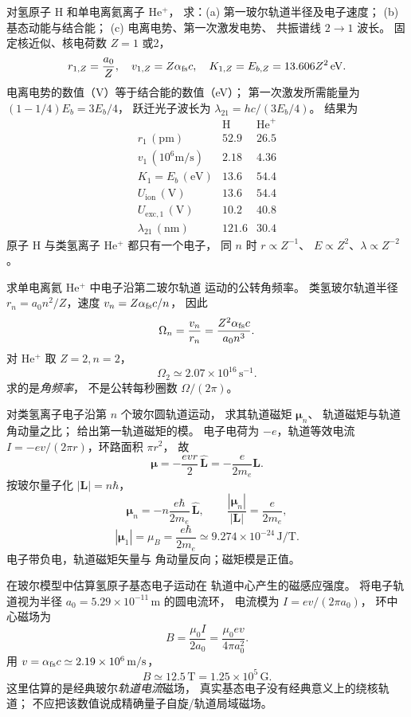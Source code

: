 对氢原子 H 和单电离氦离子 He$^+$，
求：(a) 第一玻尔轨道半径及电子速度；
(b) 基态动能与结合能；
(c) 电离电势、第一次激发电势、
共振谱线 $2\to1$ 波长。
\exsolution
固定核近似、核电荷数 $Z=1$ 或2，
\[
 r_{1,Z}=\frac{a_0}{Z},\quad
 v_{1,Z}=Z\alpha_{\rm fs}c,\quad
 K_{1,Z}=E_{b,Z}=13.606Z^2\,\mathrm{eV}.
\]
电离电势的数值（V）等于结合能的数值（eV）；
第一次激发所需能量为
$(1-1/4)E_b=3E_b/4$，
跃迁光子波长为 $\lambda_{21}=hc/(3E_b/4)$。
结果为
\[
\begin{array}{c|cc}
 &\mathrm H&\mathrm{He}^{+}\\\hline
 r_1\,(\mathrm{pm})&52.9&26.5\\
 v_1\,(10^6\mathrm{m/s})&2.18&4.36\\
 K_1=E_b\,(\mathrm{eV})&13.6&54.4\\
 U_{\mathrm{ion}}\,(\mathrm V)&13.6&54.4\\
 U_{\mathrm{exc},1}\,(\mathrm V)&10.2&40.8\\
 \lambda_{21}\,(\mathrm{nm})&121.6&30.4
\end{array}
\]
\excheck 原子 H 与类氢离子 He$^+$ 都只有一个电子，
同 $n$ 时 $r\propto Z^{-1}$、
$E\propto Z^2$、$\lambda\propto Z^{-2}$。

求单电离氦 He$^+$ 中电子沿第二玻尔轨道
运动的公转角频率。
\exsolution
类氢玻尔轨道半径
$r_n=a_0n^2/Z$，速度
$v_n=Z\alpha_{\rm fs}c/n$，
因此
\[
 \Omega_n=\frac{v_n}{r_n}
 =\frac{Z^2\alpha_{\rm fs}c}{a_0n^3}.
\]
对 He$^+$ 取 $Z=2,n=2$，
\[
 \boxed{\Omega_2\simeq2.07\times10^{16}\,\mathrm{s^{-1}}}.
\]
\excheck 求的是\emph{角频率}，
不是公转每秒圈数 $\Omega/(2\pi)$。

对类氢离子电子沿第 $n$ 个玻尔圆轨道运动，
求其轨道磁矩 $\boldsymbol\mu_n$、
轨道磁矩与轨道角动量之比；
给出第一轨道磁矩的模。
\exsolution
电子电荷为 $-e$，轨道等效电流
$I=-ev/(2\pi r)$，环路面积 $\pi r^2$，
故
\[
 \boldsymbol\mu=-\frac{evr}{2}\,\hat{\boldsymbol L}
 =-\frac e{2m_e}\boldsymbol L.
\]
按玻尔量子化 $|\boldsymbol L|=n\hbar$，
\[
 \boxed{\boldsymbol\mu_n=
 -n\frac{e\hbar}{2m_e}\,\hat{\boldsymbol L}},
 \qquad
 \boxed{\frac{|\boldsymbol\mu_n|}{|\boldsymbol L|}
 =\frac e{2m_e}},
\]
\[
 \boxed{|\boldsymbol\mu_1|=\mu_B=
 \frac{e\hbar}{2m_e}
 \simeq9.274\times10^{-24}\,\mathrm{J/T}}.
\]
\excheck 电子带负电，轨道磁矩矢量与
角动量反向；磁矩模是正值。

在玻尔模型中估算氢原子基态电子运动在
轨道中心产生的磁感应强度。
\exsolution
将电子轨道视为半径
$a_0=5.29\times10^{-11}\,\mathrm m$ 的圆电流环，
电流模为 $I=ev/(2\pi a_0)$，
环中心磁场为
\[
 B=\frac{\mu_0 I}{2a_0}
 =\frac{\mu_0 ev}{4\pi a_0^2}.
\]
用 $v=\alpha_{\rm fs}c\simeq2.19\times10^6\,\mathrm{m/s}$，
\[
 \boxed{B\simeq12.5\,\mathrm T
 =1.25\times10^5\,\mathrm G}.
\]
\excheck 这里估算的是经典玻尔\emph{轨道电流}磁场，
真实基态电子没有经典意义上的绕核轨道；
不应把该数值说成精确量子自旋/轨道局域磁场。

